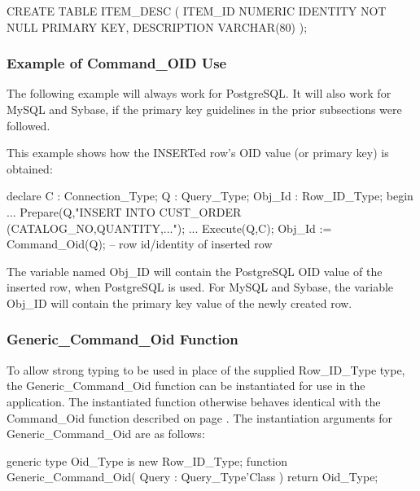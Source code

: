 \documentclass[english,letterpaper]{book}
\begin{document}
\begin{SQL}
CREATE TABLE ITEM_DESC (
   ITEM_ID     NUMERIC IDENTITY NOT NULL PRIMARY KEY,
   DESCRIPTION VARCHAR(80)
);
\end{SQL}

\subsubsection{Example of Command\_OID Use}

The following example will always work for PostgreSQL. It will also
work for MySQL and Sybase, if the primary key guidelines in the prior
subsections were followed. 

This example shows how the INSERTed row's OID value (or primary key)
is obtained:

\begin{Example}
declare
   C :      Connection_Type;
   Q :      Query_Type;
   Obj_Id : Row_ID_Type;
begin
   ...
   Prepare(Q,"INSERT INTO CUST_ORDER (CATALOG_NO,QUANTITY,...");
   ...
   Execute(Q,C);
   Obj_Id := Command_Oid(Q);  -- row id/identity of inserted row
\end{Example}

The variable named Obj\_ID will contain the PostgreSQL OID value of
the inserted row, when PostgreSQL is used. For MySQL and Sybase, the
variable Obj\_ID will contain the primary key value of the newly created
row.


\subsubsection{Generic\_Command\_Oid Function}

To allow strong typing to be used in place of the supplied Row\_ID\_Type
type, the Generic\_Command\_Oid function can be instantiated for use
in the application. The instantiated function otherwise behaves identical
with the Command\_Oid function described on page \pageref{Command_Oid Function}.
The instantiation arguments for Generic\_Command\_Oid are as follows:

\begin{Code}
generic
   type Oid_Type is new Row_ID_Type;
function Generic_Command_Oid(
   Query : Query_Type'Class
) return Oid_Type;
\end{Code}
\end{document}
